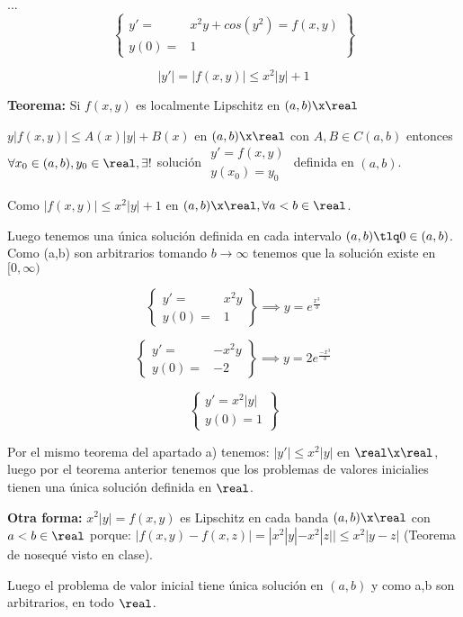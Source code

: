\documentclass[nochap]{apuntes}
\begin{document}
\begin{problem}[2]
...
\solution
\spart
\[\left\{ \begin{array}{cc} y'=&x^2y+cos(y^2) = f(x,y)\\
y(0)=&1
\end{array}\right\}\]

\[|y'| = |f(x,y)| \leq x^2|y|+1\]

\textbf{Teorema:} Si $f(x,y)$ es localmente Lipschitz en $(a,b)\x\real$

$y|f(x,y)| \leq A(x)|y|+B(x)$ en $(a,b)\x\real$ con $A,B\in C(a,b)$ entonces $\forall  x_0\in(a,b),y_0\in\real, \exists!$ solución $\begin{array}{c} y' = f(x,y)\\y(x_0)=y_0\end{array}$ definida en $(a,b)$.

Como $|f(x,y)| \leq x^2|y| +1$ en $(a,b)\x\real, \forall a<b\in\real$.

Luego tenemos una única solución definida en cada intervalo $(a,b) \tlq 0\in(a,b)$. Como (a,b) son arbitrarios tomando $b\to\infty$ tenemos que la solución existe en $[0,\infty)$

\spart \[\left\{\begin{array}{cc}
y'=&x^2y\\y(0)=&1
\end{array}\right\} \implies y=e^{\frac{x^3}{3}}\]

\[\left\{\begin{array}{cc}
y'=&-x^2y\\y(0)=&-2
\end{array}\right\} \implies y=2e^{\frac{-x^3}{3}}\]

\spart
\[\left\{\begin{array}{c}
y'=x^2|y|\\y(0)=1
\end{array}\right\}\]

Por el mismo teorema del apartado a) tenemos: $|y'| \leq x^2|y|$ en $\real\x\real$, luego por el teorema anterior tenemos que los problemas de valores inicialies tienen una única solución definida en $\real$.

\textbf{Otra forma:} $x^2|y| = f(x,y)$ es Lipschitz en cada banda $(a,b)\x\real$ con $a<b\in\real$ porque:
$|f(x,y)-f(x,z)| = |x^2|y| - x^2|z|| \leq x^2|y-z|$ (Teorema de nosequé visto en clase).

Luego el problema de valor inicial tiene única solución en $(a,b)$ y como a,b son arbitrarios, en todo $\real$.


\end{problem}
\end{document}
